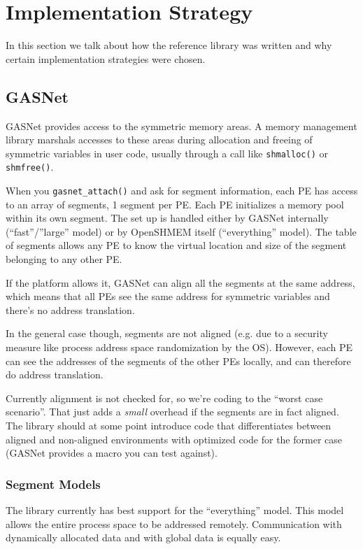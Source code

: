 \documentclass[english]{article}
\begin{document}
\section{Implementation Strategy}

In this section we talk about how the reference library was written
and why certain implementation strategies were chosen.


\subsection{GASNet}

GASNet provides access to the symmetric memory areas. A memory management
library marshals accesses to these areas during allocation and freeing
of symmetric variables in user code, usually through a call like \texttt{shmalloc()}
or \texttt{shmfree()}.

When you \texttt{gasnet\_attach()} and ask for segment information,
each PE has access to an array of segments, 1 segment per PE. Each
PE initializes a memory pool within its own segment. The set up is
handled either by GASNet internally ({}``fast''/''large'' model)
or by OpenSHMEM itself ({}``everything'' model). The table of segments
allows any PE to know the virtual location and size of the segment
belonging to any other PE.

If the platform allows it, GASNet can align all the segments at the
same address, which means that all PEs see the same address for symmetric
variables and there's no address translation.

In the general case though, segments are not aligned (e.g. due to
a security measure like process address space randomization by the
OS). However, each PE can see the addresses of the segments of the
other PEs locally, and can therefore do address translation.

Currently alignment is not checked for, so we're coding to the {}``worst
case scenario''. That just adds a \emph{small} overhead if the segments
are in fact aligned. The library should at some point introduce code
that differentiates between aligned and non-aligned environments with
optimized code for the former case (GASNet provides a macro you can
test against).


\subsubsection{Segment Models}

The library currently has best support for the {}``everything''
model. This model allows the entire process space to be addressed
remotely. Communication with dynamically allocated data and with global
data is equally easy.
\end{document}
